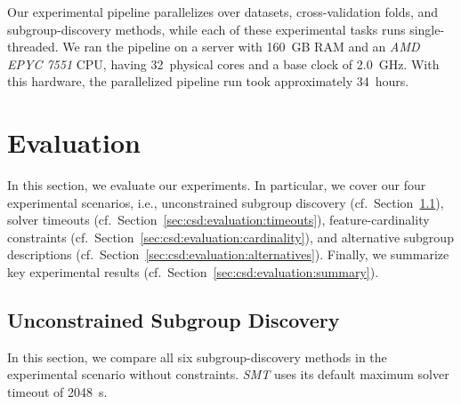 \documentclass{article}
\theoremstyle{definition}
\begin{document}
Our experimental pipeline parallelizes over datasets, cross-validation folds, and subgroup-discovery methods, while each of these experimental tasks runs single-threaded.
We ran the pipeline on a server with 160~GB RAM and an \emph{AMD EPYC 7551} CPU, having 32~physical cores and a base clock of 2.0~GHz.
With this hardware, the parallelized pipeline run took approximately 34~hours.

\section{Evaluation}
\label{sec:csd:evaluation}

In this section, we evaluate our experiments.
In particular, we cover our four experimental scenarios, i.e., unconstrained subgroup discovery (cf.~Section~\ref{sec:csd:evaluation:unconstrained}), solver timeouts (cf.~Section~\ref{sec:csd:evaluation:timeouts}), feature-cardinality constraints (cf.~Section~\ref{sec:csd:evaluation:cardinality}), and alternative subgroup descriptions (cf.~Section~\ref{sec:csd:evaluation:alternatives}).
Finally, we summarize key experimental results (cf.~Section~\ref{sec:csd:evaluation:summary}).

\subsection{Unconstrained Subgroup Discovery}
\label{sec:csd:evaluation:unconstrained}

In this section, we compare all six subgroup-discovery methods in the experimental scenario without constraints.
\emph{SMT} uses its default maximum solver timeout of 2048~s.
\end{document}
